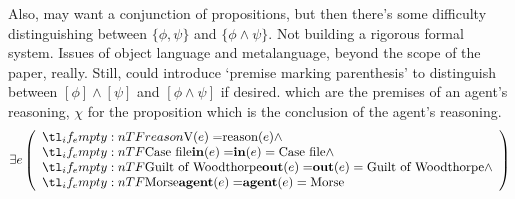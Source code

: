 \documentclass[10pt]{article}
\newcommand{\hozlinedash}[0]{%
  \noindent\hdashrule[0.5ex][c]{\textwidth}{.1pt}{2.5pt}
}
\begin{document}
\begin{itemize}
{    Also, may want a conjunction of propositions, but then there's some difficulty distinguishing between \(\{\phi,\psi\}\) and \(\{\phi \land \psi\}\).
    Not building a rigorous formal system.
    Issues of object language and metalanguage, beyond the scope of the paper, really.
  Still, could introduce `premise marking parenthesis' to distinguish between \([\phi] \land [\psi]\) and \([\phi \land \psi]\) if desired.}
  which are the premises of an agent's reasoning, \(\chi\) for the proposition which is the conclusion of the agent's reasoning.
  \[
    \exists e
    \left(
      \begin{array}{l}
        \everb{reason} \land \\
        \ein{\text{Case file}} \land \\
        \eout{\text{Guilt of Woodthorpe}} \land \\
        \eagent{\text{Morse}}
      \end{array}
    \right)
  \]
\end{itemize}

\hozlinedash
\end{document}
